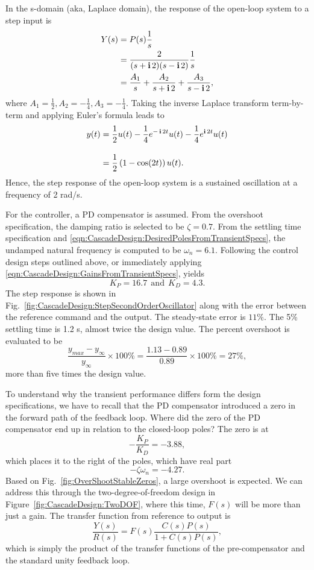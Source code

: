 \solution
In the s-domain (aka, Laplace domain), the response of the open-loop system to a step input is
\begin{align*}
Y(s) &= P(s) \frac{1}{s} \\
     &= \frac{2}{(s+\mathop{\bm{\mathrm i}} 2)(s-\mathop{\bm{\mathrm i}} 2)} \frac{1}{s} \\
     &= \frac{A_1}{s} + \frac{A_2}{s+\mathop{\bm{\mathrm i}} 2} + \frac{A_3}{s-\mathop{\bm{\mathrm i}} 2},
\end{align*}
where $A_1 = \frac{1}{2},  A_2   = -\frac{1}{4},  A_3  = -\frac{1}{4}$. Taking the inverse Laplace transform term-by-term and applying Euler's formula leads to
\begin{align*} y(t) &= \frac{1}{2} u(t) -\frac{1}{4} e^{-\mathop{\bm{\mathrm i}} 2t}u(t) -\frac{1}{4} e^{\mathop{\bm{\mathrm i}} 2t} u(t)\\[1em]
&=  \frac{1}{2}\left( 1-\cos(2t) \right) u(t).
\end{align*}
Hence, the step response of the open-loop system is a sustained oscillation at a frequency of 2 rad/s.

For the controller, a PD compensator is assumed. From the overshoot specification, the damping ratio is selected to be $\zeta = 0.7$. From the settling time specification and \eqref{eqn:CascadeDesign:DesiredPolesFromTransientSpecs}, the undamped natural frequency is computed to be $ \omega_n = 6.1$. Following the control design steps outlined above, or immediately applying  \eqref{eqn:CascadeDesign:GainsFromTransientSpecs}, yields
$$K_P = 16.7  ~~\text{and}~~ K_D = 4.3.$$
The step response is shown in Fig.~\ref{fig:CascadeDesign:StepSecondOrderOscillator} along with the error between the reference command and the output. The steady-state error is $11\%$. The 5\% settling time is 1.2 s, almost twice the design value.  The percent overshoot is evaluated to be
 $$ \frac{y_{max}-y_\infty}{y_\infty}\times 100\% =  \frac{1.13-0.89}{0.89}\times 100\% = 27 \%,$$
 more than five times the design value.

 To understand why the transient performance differs form the design specifications, we have to recall that the PD compensator introduced a zero in the forward path of the feedback loop. Where did the zero of the PD compensator end up in relation to the closed-loop poles? The zero is at
$$ - \frac{K_P}{K_D} = -3.88,$$
which places it to the right of the poles, which have real part
$$-\zeta \omega_n = -4.27 .$$
Based on Fig.~\ref{fig:OverShootStableZeros}, a large overshoot is expected. 
We can address this through the two-degree-of-freedom design in Figure~\ref{fig:CascadeDesign:TwoDOF}, where this time, $F(s)$ will be more than just a gain. The transfer function from reference to output is
  $$\frac{{Y(s)}}{{R(s)}} =
F(s)\frac{{C(s)P(s)}}{{1 + C(s)P(s)}}, $$
which is simply the product of the transfer functions of the pre-compensator and the standard unity feedback loop.



